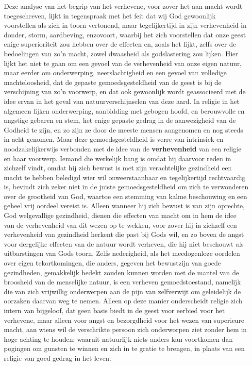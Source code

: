 Deze analyse van het begrip van het verhevene, voor zover het aan macht wordt toegeschreven, lijkt in tegenspraak met het feit dat wij God gewoonlijk voorstellen als zich in toorn vertonend, maar tegelijkertijd in zijn verhevenheid in donder, storm, aardbeving, enzovoort, waarbij het zich voorstellen dat onze geest enige superioriteit zou hebben over de effecten en, zoals het lijkt, zelfs over de bedoelingen van zo’n macht, zowel dwaasheid als godslastering zou lijken. Hier lijkt het niet te gaan om een gevoel van de verhevenheid van onze eigen natuur, maar eerder om onderwerping, neerslachtigheid en een gevoel van volledige machteloosheid, dat de gepaste gemoedsgesteldheid van de geest is bij de verschijning van zo’n voorwerp, en dat ook gewoonlijk wordt geassocieerd met de idee ervan in het geval van natuurverschijnselen van deze aard. In religie in het algemeen lijken onderwerping, aanbidding met gebogen hoofd, en berouwvolle en angstige gebaren en stem, het enige gepaste gedrag in de aanwezigheid van de Godheid te zijn, en zo zijn ze door de meeste mensen aangenomen en nog steeds in acht genomen. Maar deze gemoedsgesteldheid is verre van intrinsiek en noodzakelijkerwijs verbonden met de idee van de \textbf{verhevenheid} van een religie en haar voorwerp. Iemand die werkelijk bang is omdat hij daarvoor reden in zichzelf vindt, omdat hij zich bewust is met zijn verachtelijke gezindheid een macht te hebben beledigd wier wil onweerstaanbaar en tegelijkertijd rechtvaardig is, bevindt zich zeker niet in de juiste gemoedsgesteldheid om zich te verwonderen over de grootheid van God, waartoe een stemming van kalme beschouwing en een geheel vrij oordeel vereist is. Alleen wanneer hij zich bewust is van zijn oprechte, God welgevallige gezindheid, dienen die effecten van macht om in hem de idee van de verhevenheid van dit wezen op te wekken, voor zover hij in zichzelf een verhevenheid van gezindheid herkent die past bij Gods wil, en zo boven de angst voor dergelijke effecten van de natuur wordt verheven, die hij niet beschouwt als uitbarstingen van Gods toorn. Zelfs nederigheid, als het meedogenloze oordelen over eigen tekortkomingen, die anders, gegeven het bewustzijn van goede gezindheden, gemakkelijk bedekt zouden kunnen worden met de mantel van de broosheid van de menselijke natuur, is een verheven gemoedstoestand, namelijk die van zich vrijwillig onderwerpen aan de pijn van zelfverwijt om geleidelijk de oorzaken daarvan weg te nemen. Alleen op deze manier onderscheidt religie zich intern van bijgeloof, dat geen basis biedt in de geest voor eerbied voor het verhevene, maar alleen voor angst en bezorgdheid voor het wezen van superieure macht, aan wiens wil de verschrikte persoon zich onderworpen ziet zonder hem in hoge achting te houden; waaruit natuurlijk niets anders kan voortkomen dan pogingen om gunsten te winnen en zich in te gratie te brengen, in plaats van een religie van goed gedrag in het leven.

